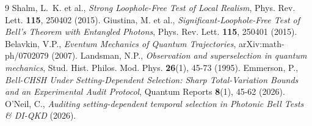 \documentclass[11pt,twocolumn]{article}
\begin{document}
\begin{thebibliography}{9}
 Shalm, L.~K. et al., \textit{Strong Loophole-Free Test of Local Realism}, Phys. Rev. Lett. \textbf{115}, 250402 (2015).
 Giustina, M. et al., \textit{Significant-Loophole-Free Test of Bell's Theorem with Entangled Photons}, Phys. Rev. Lett. \textbf{115}, 250401 (2015).
 Belavkin, V.P., \textit{Eventum Mechanics of Quantum Trajectories}, arXiv:math-ph/0702079 (2007).
 Landsman, N.P., \textit{Observation and superselection in quantum mechanics}, Stud. Hist. Philos. Mod. Phys. \textbf{26}(1), 45-73 (1995).
 Emmerson, P., \textit{Bell-CHSH Under Setting-Dependent Selection: Sharp Total-Variation Bounds and an Experimental Audit Protocol}, Quantum Reports \textbf{8}(1), 45-62 (2026).
 O'Neil, C., \textit{Auditing setting-dependent temporal selection in Photonic Bell Tests \& DI-QKD} (2026).
\end{thebibliography}
\end{document}
